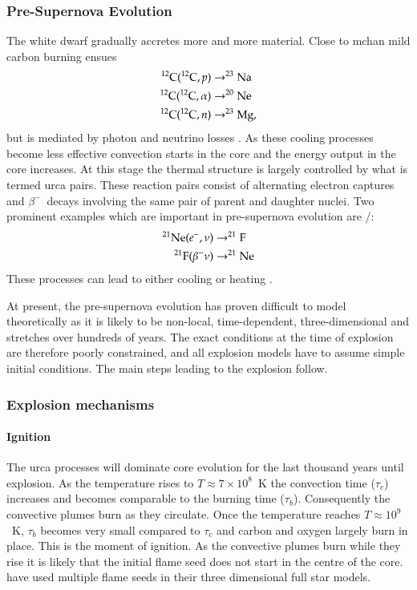 \subsubsection{Pre-Supernova Evolution}
The white dwarf gradually accretes more and more material. Close to \gls{mchan} mild carbon burning ensues
\begin{align}
\nonumber
\Carb(\Carb,p) &\rightarrow \Na \\  \nonumber
\Carb(\Carb,\alpha) &\rightarrow \Ne \\ 
\Carb(\Carb,n) &\rightarrow \Mg[23],
\end{align}
but is mediated by photon and neutrino losses \citep{2005NuPhA.758..463L, 2007nps..book.....I}. As these cooling processes become less effective convection starts in the core and the energy output in the core increases. At this stage the thermal structure is largely controlled by what is termed \gls{urca} pairs. These reaction pairs consist of alternating electron captures and $\beta^-$~decays involving the same pair of parent and daughter nuclei. Two prominent examples which are important in pre-supernova evolution are \Ne[21]/\F[21]:
\begin{align}
\nonumber
\Ne[21](e^-, \nu) &\rightarrow \F[21] \\
\F[21](\beta^- \nu) &\rightarrow \Ne[21]
\end{align}
These processes can lead to either cooling or heating \citep{2005NuPhA.758..463L}.

At present, the pre-supernova evolution has proven difficult to model theoretically as it is likely to be non-local, time-dependent, three-dimensional and stretches over hundreds of years. The exact conditions at the time of explosion are therefore poorly constrained, and all explosion models have to assume simple initial conditions. The main steps leading to the explosion follow.

\subsubsection{Explosion mechanisms}

\paragraph{Ignition} The \gls{urca} processes will dominate core evolution for the last thousand years until explosion. As the temperature rises to $T\approx7 \times 10^8$~K \citep{2000ARA&A..38..191H} the convection time ($\tau_c$) increases and becomes comparable to the burning time ($\tau_b$). Consequently the convective plumes burn as they circulate. Once the temperature reaches $T\approx 10^9$~K, $\tau_b$ becomes very small compared to $\tau_c$ and carbon and oxygen largely burn in place. This is the moment of ignition. As the convective plumes burn while they rise it is likely that the initial flame seed does not start in the centre of the core. \cite{2005A&A...431..635R} have used multiple flame seeds in their three dimensional full star models.

